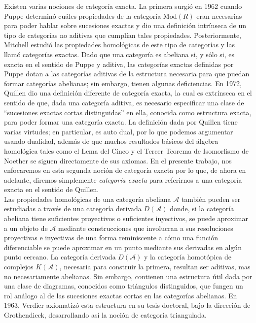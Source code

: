 \documentclass[tesis]{subfiles}
\begin{document}
Existen varias nociones de categoría exacta. La primera surgió en 1962 cuando Puppe\cite{Puppe} determinó cuáles propiedades de la categoría $\text{Mod}(R)$ eran necesarias para poder hablar sobre sucesiones exactas y dio una definición intrínseca de un tipo de categorías no aditivas que cumplían tales propiedades. Posteriormente, Mitchell\cite{Mitchell} estudió las propiedades homológicas de este tipo de categorías y las llamó categorías exactas. Dado que una categoría es abeliana si, y sólo si, es  exacta en el sentido de Puppe y aditiva, las categorías exactas definidas por Puppe dotan a las categorías aditivas de la estructura necesaria para que puedan formar categorías abelianas; sin embargo, tienen algunas deficiencias. En 1972, Quillen\cite{Quillen} dio una definición diferente de categoría exacta, la cual es extrínseca en el sentido de que, dada una categoría aditiva, es necesario especificar una clase de ``sucesiones exactas cortas distinguidas'' en ella, conocida como estructura exacta, para poder formar una categoría exacta. La definición dada por Quillen tiene varias virtudes; en particular, es auto dual, por lo que podemos argumentar usando dualidad, además de que muchos resultados básicos del álgebra homológica tales como el Lema del Cinco y el Tercer Teorema de Isomorfismo de Noether se siguen directamente de sus axiomas. En el presente trabajo, nos enfocaremos en esta segunda noción de categoría exacta por lo que, de ahora en adelante, diremos simplemente \emph{categoría exacta} para referirnos a una categoría exacta en el sentido de Quillen. \\ %

Las propiedades homológicas de una categoría abeliana $\mathscr{A}$ también pueden ser estudiadas a través de una categoría derivada $D(\mathscr{A})$ donde, si la categoría abeliana tiene suficientes proyectivos o suficientes inyectivos, se puede aproximar a un objeto de $\mathscr{A}$ mediante construcciones que involucran a sus resoluciones proyectivas e inyectivas de una forma reminiscente a cómo una función diferenciable se puede aproximar en un punto mediante sus derivadas en algún punto cercano. La categoría derivada $D(\mathscr{A})$ y la categoría homotópica de complejos $K(\mathscr{A})$, necesaria para construir la primera, resultan ser aditivas, mas no necesariamente abelianas. Sin embargo, contienen una estructura útil dada por una clase de diagramas, conocidos como triángulos distinguidos, que fungen un rol análogo al de las sucesiones exactas cortas en las categorías abelianas\cite{Flores-Galicia}. En 1963, Verdier\cite{Verdier} axiomatizó esta estructura en su tesis doctoral, bajo la dirección de Grothendieck, desarrollando así la noción de categoría triangulada. \\
\end{document}
